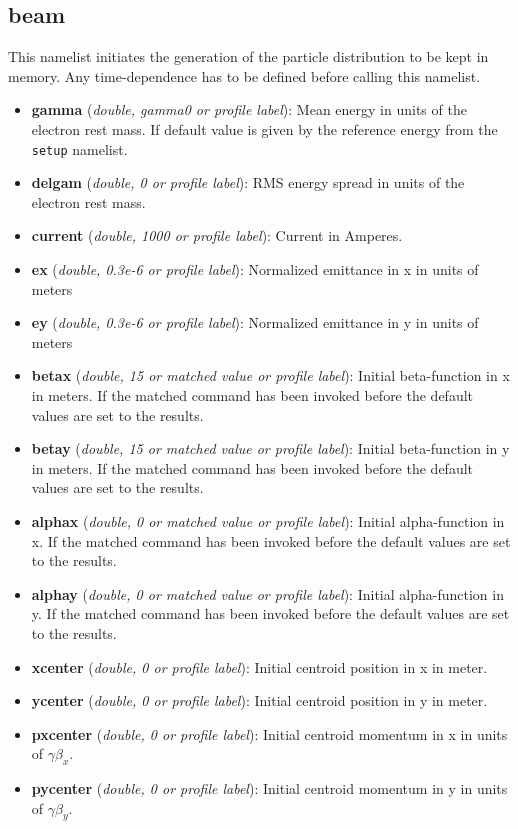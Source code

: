 \documentclass[12pt]{book}
\begin{document}
\subsection{\sf beam}
This namelist initiates the generation of the particle distribution to be kept in memory. Any time-dependence has to be defined before calling this namelist.
\begin{itemize}
\item {\bf gamma} ({\it double, gamma0 or profile label}): Mean energy in units of the electron rest mass. If default value is given by the reference energy from the {\tt setup} namelist.
\item {\bf delgam} ({\it double, 0 or profile label}): RMS energy spread in units of the electron rest mass.
\item {\bf current} ({\it double, 1000 or profile label}): Current in Amperes.
\item {\bf ex} ({\it double, 0.3e-6 or profile label}): Normalized emittance in x in units of meters
\item {\bf ey} ({\it double, 0.3e-6 or profile label}): Normalized emittance in y in units of meters
\item {\bf betax} ({\it double, 15 or matched value or profile label}): Initial beta-function in x in meters. If the matched command has been invoked before the default values are set to the results.
\item {\bf betay} ({\it double, 15 or matched value or profile label}): Initial beta-function in y in meters. If the matched command has been invoked before the default values are set to the results.
\item {\bf alphax} ({\it double, 0 or matched value or profile label}): Initial alpha-function in x. If the matched command has been invoked before the default values are set to the results.
\item {\bf alphay} ({\it double, 0 or matched value or profile label}): Initial alpha-function in y. If the matched command has been invoked before the default values are set to the results.
\item {\bf xcenter} ({\it double, 0 or profile label}): Initial centroid position in x in meter.
\item {\bf ycenter} ({\it double, 0 or profile label}): Initial centroid position in y in meter.
\item {\bf pxcenter} ({\it double, 0 or profile label}): Initial centroid momentum in x in units of $\gamma\beta_x$.
\item {\bf pycenter} ({\it double, 0 or profile label}): Initial centroid momentum in y in units of $\gamma\beta_y$.

\end{itemize}
\end{document}
